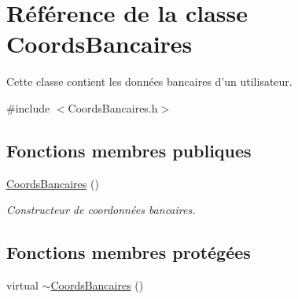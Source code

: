 \hypertarget{class_coords_bancaires}{\section{Référence de la classe Coords\-Bancaires}
\label{class_coords_bancaires}
}


Cette classe contient les données bancaires d'un utilisateur.  




{\ttfamily \#include $<$Coords\-Bancaires.\-h$>$}

\subsection*{Fonctions membres publiques}
\begin{DoxyCompactItemize}
\item 
\hyperlink{class_coords_bancaires_aa8d3cbc47bcdc55595a4fe6d99405951}{Coords\-Bancaires} ()
\begin{DoxyCompactList}\small\item\em Constructeur de coordonnées bancaires. \end{DoxyCompactList}\end{DoxyCompactItemize}
\subsection*{Fonctions membres protégées}
\begin{DoxyCompactItemize}
\item 
virtual \hyperlink{class_coords_bancaires_adfe7e386ce11525cb0ebf9acb5853b84}{$\sim$\-Coords\-Bancaires} ()
\end{DoxyCompactItemize}
